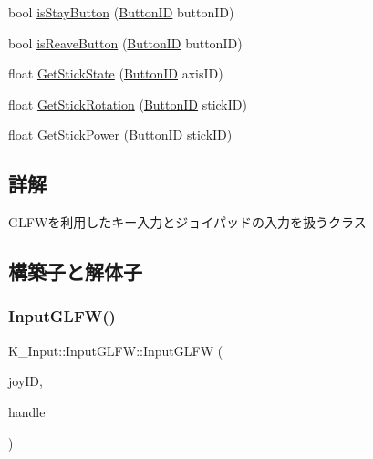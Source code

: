 \begin{DoxyCompactItemize}
\item 
bool \mbox{\hyperlink{class_k___input_1_1_input_g_l_f_w_a09054346958c6a88196146cb3e3d9d08}{is\+Stay\+Button}} (\mbox{\hyperlink{namespace_k___input_a2a6df758ee5a36c29d234fe7a27beb2c}{Button\+ID}} button\+ID)
\item 
bool \mbox{\hyperlink{class_k___input_1_1_input_g_l_f_w_aa0352394805c13930acf444dbf728417}{is\+Reave\+Button}} (\mbox{\hyperlink{namespace_k___input_a2a6df758ee5a36c29d234fe7a27beb2c}{Button\+ID}} button\+ID)
\item 
float \mbox{\hyperlink{class_k___input_1_1_input_g_l_f_w_ab18a2edb87c07b7e4b6c747706a39081}{Get\+Stick\+State}} (\mbox{\hyperlink{namespace_k___input_a2a6df758ee5a36c29d234fe7a27beb2c}{Button\+ID}} axis\+ID)
\item 
float \mbox{\hyperlink{class_k___input_1_1_input_g_l_f_w_a98520dfa7ea9ca2042ef2711755f7909}{Get\+Stick\+Rotation}} (\mbox{\hyperlink{namespace_k___input_a2a6df758ee5a36c29d234fe7a27beb2c}{Button\+ID}} stick\+ID)
\item 
float \mbox{\hyperlink{class_k___input_1_1_input_g_l_f_w_a1b585f903d5c05d75375761fcc672a4c}{Get\+Stick\+Power}} (\mbox{\hyperlink{namespace_k___input_a2a6df758ee5a36c29d234fe7a27beb2c}{Button\+ID}} stick\+ID)
\end{DoxyCompactItemize}


\subsection{詳解}
G\+L\+F\+Wを利用したキー入力とジョイパッドの入力を扱うクラス 

\subsection{構築子と解体子}
\mbox{\label{class_k___input_1_1_input_g_l_f_w_a733179261d9b94d99ca3a0a60c93437c}} 
\subsubsection{\texorpdfstring{Input\+G\+L\+F\+W()}{InputGLFW()}}
{\footnotesize\ttfamily K\+\_\+\+Input\+::\+Input\+G\+L\+F\+W\+::\+Input\+G\+L\+FW (\begin{DoxyParamCaption}\item[{unsigned int}]{joy\+ID,  }\item[{G\+L\+F\+Wwindow $\ast$}]{handle }\end{DoxyParamCaption})}



